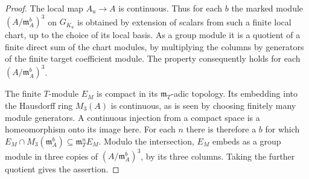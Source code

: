 \documentclass[a4paper,11pt]{article}
\theoremstyle{definition}
\theoremstyle{remark}
\numberwithin{equation}{section}
\begin{document}
\begin{proof}
The local map \(A_u\to A\) is continuous. Thus for each \(b\)
the marked module \((A/\mathfrak m_A^b)^3\) on \(G_{K_u}\)
is obtained by extension of scalars from such a finite local
chart, up to the choice of its local basis. As a group module
it is a quotient of a finite direct sum of the chart modules, by multiplying the columns by generators of the finite target
coefficient module. The property consequently holds for
each \((A/\mathfrak m_A^b)^3\).

The finite \(T\)-module \(E_M\) is compact in its
\(\mathfrak m_T\)-adic topology. Its embedding into the
Hausdorff ring \(M_3(A)\) is continuous, as is seen by
choosing finitely many module generators. A continuous
injection from a compact space is a homeomorphism onto its
image here. For each \(n\) there is therefore a \(b\) for
which \(E_M\cap M_3(\mathfrak m_A^b)\subseteq
\mathfrak m_T^n E_M\). Modulo the intersection, \(E_M\) embeds
as a group module in three copies of
\((A/\mathfrak m_A^b)^3\), by its three columns. Taking the
further quotient gives the assertion.
\end{proof}
\end{document}
